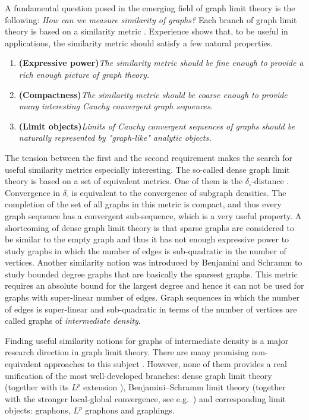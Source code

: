 \documentclass[a4wider]{amsart}
\theoremstyle{definitionbreak}\newtheorem{D}[theorem]{Definition}
\theoremstyle{definitionbreak}\newtheorem*{D*}{Definition}
\begin{document}
A fundamental question posed in the emerging field of graph limit theory is the following: {\it How can we measure similarity of graphs?} Each branch of graph limit theory is based on a similarity metric \cite{lovaszbook}. Experience shows that, to be useful in applications, the similarity metric should satisfy a few natural properties. 
\begin{enumerate}
\item {\bf (Expressive power)}{\it The similarity metric should be fine enough to provide a rich enough picture of graph theory. }
\item {\bf (Compactness)}{\it The similarity metric should be coarse enough to provide many interesting Cauchy convergent graph sequences.}
\item {\bf (Limit objects)}{\it Limits of Cauchy convergent sequences of graphs should be naturally represented by "graph-like" analytic objects.}

\end{enumerate}
The tension between the first and the second requirement makes the search for useful similarity metrics especially interesting. The so-called dense graph limit theory is based on a set of equivalent metrics. One of them is the $\delta_\square$-distance \cite{BCLTV, LSz, LSz2}. Convergence in $\delta_\square$ is equivalent to the convergence of subgraph densities. The completion of the set of all graphs in this metric is compact, and thus every graph sequence has a convergent sub-sequence, which is a very useful property. A shortcoming of dense graph limit theory is that sparse graphs are considered to be similar to the empty graph and thus it has not enough expressive power to study graphs in which the number of edges is sub-quadratic in the number of vertices. Another similarity notion was introduced by Benjamini and Schramm \cite{BS} to study bounded degree graphs that are basically the sparsest graphs. This metric requires an absolute bound for the largest degree and hence it can not be used for graphs with super-linear number of edges. Graph sequences in which the number of edges is super-linear and sub-quadratic in terms of the number of vertices are called graphs of {\it intermediate density}. 

Finding useful similarity notions for graphs of intermediate density is a major research direction in graph limit theory. There are many promising non-equivalent approaches to this subject \cite{BCCH, BCCZ, BCCZ2, frenkel, janson, nesetrilkonyv, nesetril2, sparse}. 
However, none of them provides a real unification of the most well-developed branches: dense graph limit theory (together with its $L^p$ extension \cite{BCCZ, BCCZ2}), Benjamini--Schramm limit theory (together with the stronger local-global convergence, see e.g.\ \cite{BR, HLSz}) and corresponding limit objects: graphons, $L^p$ graphons and graphings. 
\end{document}
